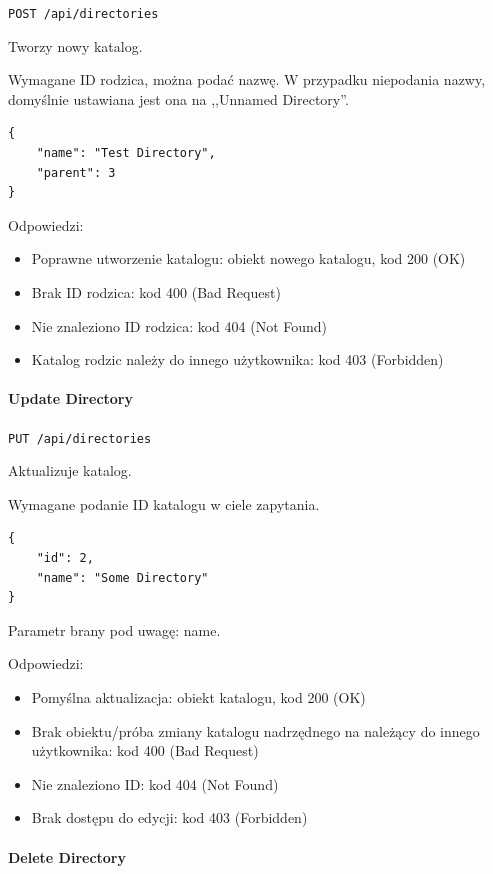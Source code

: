 \documentclass[a4paper,twoside,12pt]{book}
\begin{document}
\texttt{POST /api/directories}

Tworzy nowy katalog.

Wymagane ID rodzica, można podać nazwę. W przypadku niepodania nazwy, domyślnie ustawiana jest ona na ,,Unnamed Directory''.

\begin{verbatim}
{
    "name": "Test Directory",
    "parent": 3
}
\end{verbatim}

Odpowiedzi: 
\begin{itemize}
	\item Poprawne utworzenie katalogu: obiekt nowego katalogu, kod 200 (OK) 
	\item Brak ID rodzica: kod 400 (Bad Request)
	\item Nie znaleziono ID rodzica: kod 404 (Not Found) 
	\item Katalog rodzic należy do innego użytkownika: kod 403 (Forbidden)
\end{itemize}

\paragraph{Update Directory}

\texttt{PUT /api/directories}

Aktualizuje katalog.

Wymagane podanie ID katalogu w ciele zapytania.

\begin{verbatim}
{
    "id": 2,
    "name": "Some Directory"
}
\end{verbatim}

Parametr brany pod uwagę: name.

Odpowiedzi: 
\begin{itemize}
	\item Pomyślna aktualizacja: obiekt katalogu, kod 200 (OK)
	\item Brak obiektu/próba zmiany katalogu nadrzędnego na należący do innego użytkownika: kod 400 (Bad Request) 
	\item Nie znaleziono ID: kod 404 (Not Found) 
	\item Brak dostępu do edycji: kod 403 (Forbidden)
\end{itemize}

\paragraph{Delete Directory}
\end{document}
